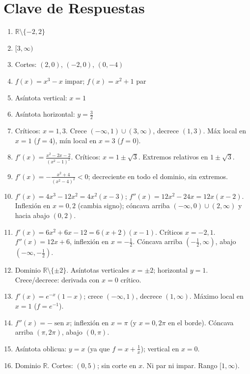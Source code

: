 \documentclass[12pt, letterpaper]{article}
\begin{document}
\newpage
\ifmwclaves
  \section{Clave de Respuestas}

  \begin{enumerate}[leftmargin=*, label=\textbf{\arabic*.}]
    \item $\mathbb{R}\setminus\{-2, 2\}$
    \item $[3, \infty)$
    \item Cortes: $(2,0)$, $(-2,0)$, $(0,-4)$
    \item $f(x)=x^3-x$ impar; $f(x)=x^2+1$ par
    \item Asíntota vertical: $x = 1$
    \item Asíntota horizontal: $y = \frac{3}{2}$
    \item Críticos: $x=1,3$. Crece $(-\infty,1)\cup(3,\infty)$, decrece $(1,3)$. Máx local en $x=1$ ($f=4$), mín local en $x=3$ ($f=0$).
    \item $f'(x) = \frac{x^2-2x-2}{(x^2-1)^2}$. Críticos: $x = 1\pm\sqrt{3}$. Extremos relativos en $1\pm\sqrt{3}$.
    \item $f'(x) = -\frac{x^2+4}{(x^2-4)^2} < 0$; decreciente en todo el dominio, sin extremos.
    \item $f'(x) = 4x^3-12x^2 = 4x^2(x-3)$; $f''(x) = 12x^2-24x = 12x(x-2)$. Inflexión en $x=0,2$ (cambia signo); cóncava arriba $(-\infty,0)\cup(2,\infty)$ y hacia abajo $(0,2)$.
    \item $f'(x) = 6x^2+6x-12 = 6(x+2)(x-1)$. Críticos $x=-2,1$. $f''(x)=12x+6$, inflexión en $x=-\frac{1}{2}$. Cóncava arriba $(-\frac{1}{2},\infty)$, abajo $(-\infty,-\frac{1}{2})$.
    \item Dominio $\mathbb{R}\setminus\{\pm 2\}$. Asíntotas verticales $x=\pm2$; horizontal $y=1$. Crece/decrece: derivada con $x=0$ crítico.
    \item $f'(x) = e^{-x}(1-x)$; crece $(-\infty,1)$, decrece $(1,\infty)$. Máximo local en $x=1$ ($f=e^{-1}$).
    \item $f''(x) = -\operatorname{sen} x$; inflexión en $x = \pi$ (y $x=0,2\pi$ en el borde). Cóncava arriba $(\pi,2\pi)$, abajo $(0,\pi)$.
    \item Asíntota oblicua: $y = x$ (ya que $f = x + \frac{1}{x}$); vertical en $x=0$.
    \item Dominio $\mathbb{R}$. Cortes: $(0,5)$; sin corte en $x$. Ni par ni impar. Rango $[1,\infty)$.

\end{enumerate}
\end{document}
